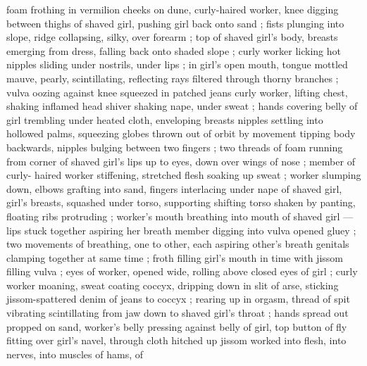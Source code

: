 foam frothing in vermilion cheeks  {\semislash} on 
dune, curly-haired worker, knee digging between thighs of shaved 
girl, pushing girl back onto sand ; fists plunging into slope, ridge 
collapsing, silky, over forearm ; top of shaved girl's body, breasts 
emerging from dress, falling back onto shaded slope ; curly worker 
licking hot nipples sliding under nostrils, under lips ; in girl's open 
mouth, tongue mottled mauve, pearly, scintillating, reflecting rays 
filtered through thorny branches ; vulva oozing against knee 
squeezed in patched jeans {\col} curly worker, lifting chest, shaking 
inflamed head {\col} shiver shaking nape, under sweat ; hands covering 
belly of girl trembling under heated cloth, enveloping breasts 
nipples settling into hollowed palms, squeezing globes thrown out of 
orbit by movement tipping body backwards, nipples bulging between 
two fingers ; two threads of foam running from corner of shaved 
girl's lips up to eyes, down over wings of nose ; member of curly- 
haired worker stiffening, stretched flesh soaking up sweat ; worker 
slumping down, elbows grafting into sand, fingers interlacing under 
nape of shaved girl, girl's breasts, squashed under torso, supporting 
shifting torso shaken by panting, floating ribs protruding ; worker's 
mouth breathing into mouth of shaved girl --- lips stuck together {\dashcom}
aspiring her breath {\col} member digging into vulva opened gluey ; two 
movements of breathing, one to other, each aspiring other's breath 
genitals clamping together at same time ; froth filling girl's mouth in 
time with jissom filling vulva ; eyes of worker, opened wide, rolling 
above closed eyes of girl ; curly worker moaning, sweat coating 
coccyx, dripping down in slit of arse, sticking jissom-spattered denim 
of jeans to coccyx ; rearing up in orgasm, thread of spit vibrating 
scintillating from jaw down to shaved girl's throat ; hands spread out 
propped on sand, worker's belly pressing against belly of girl, top 
button of fly fitting over girl's navel, through cloth hitched up 
jissom worked into flesh, into nerves, into muscles of hams, of 

